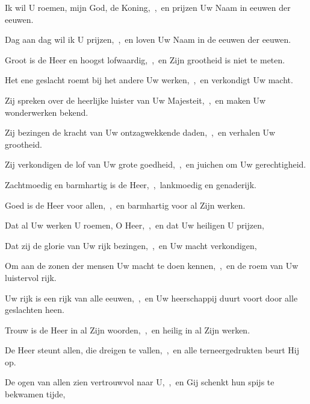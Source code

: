 \documentclass[12pt,twoside,a5paper]{article}
\begin{document}



\begin{halfparskip}
  Ik wil U roemen, mijn God, de Koning,~\sep\ en prijzen Uw Naam in eeuwen der eeuwen.


  Dag aan dag wil ik U prijzen,~\sep\ en loven Uw Naam in de eeuwen der eeuwen.

  Groot is de Heer en hoogst lofwaardig,~\sep\ en Zijn grootheid is niet te meten.

  Het ene geslacht roemt bij het andere Uw werken,~\sep\ en verkondigt Uw macht.

  Zij spreken over de heerlijke luister van Uw Majesteit,~\sep\ en maken Uw wonderwerken
  bekend.

  Zij bezingen de kracht van Uw ontzagwekkende daden,~\sep\ en verhalen Uw grootheid.

  Zij verkondigen de lof van Uw grote goedheid,~\sep\ en juichen om Uw gerechtigheid.

  Zachtmoedig en barmhartig is de Heer,~\sep\ lankmoedig en genaderijk.

  Goed is de Heer voor allen,~\sep\ en barmhartig voor al Zijn werken.

  Dat al Uw werken U roemen, O Heer,~\sep\ en dat Uw heiligen U prijzen,

  Dat zij de glorie van Uw rijk bezingen,~\sep\ en Uw macht verkondigen,

  Om aan de zonen der mensen Uw macht te doen kennen,~\sep\ en de roem van Uw luistervol rijk.

  Uw rijk is een rijk van alle eeuwen,~\sep\ en Uw heerschappij duurt voort door alle geslachten heen.

  Trouw is de Heer in al Zijn woorden,~\sep\ en heilig in al Zijn werken.

  De Heer steunt allen, die dreigen te vallen,~\sep\ en alle terneergedrukten beurt Hij op.

  De ogen van allen zien vertrouwvol naar U,~\sep\ en Gij schenkt hun spijs te bekwamen tijde,


\end{halfparskip}
\end{document}
